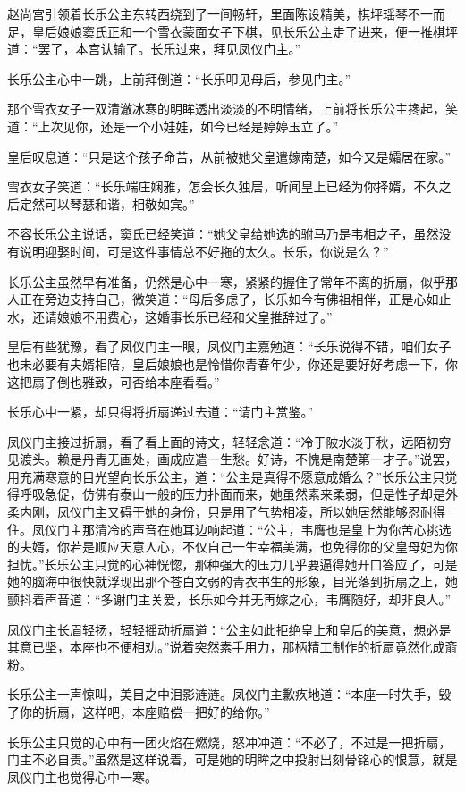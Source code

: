 赵尚宫引领着长乐公主东转西绕到了一间畅轩，里面陈设精美，棋坪瑶琴不一而足，皇后娘娘窦氏正和一个雪衣蒙面女子下棋，见长乐公主走了进来，便一推棋坪道：“罢了，本宫认输了。长乐过来，拜见凤仪门主。”

长乐公主心中一跳，上前拜倒道：“长乐叩见母后，参见门主。”

那个雪衣女子一双清澈冰寒的明眸透出淡淡的不明情绪，上前将长乐公主搀起，笑道：“上次见你，还是一个小娃娃，如今已经是婷婷玉立了。”

皇后叹息道：“只是这个孩子命苦，从前被她父皇遣嫁南楚，如今又是孀居在家。”

雪衣女子笑道：“长乐端庄娴雅，怎会长久独居，听闻皇上已经为你择婿，不久之后定然可以琴瑟和谐，相敬如宾。”

不容长乐公主说话，窦氏已经笑道：“她父皇给她选的驸马乃是韦相之子，虽然没有说明迎娶时间，可是这件事情总不好拖的太久。长乐，你说是么？”

长乐公主虽然早有准备，仍然是心中一寒，紧紧的握住了常年不离的折扇，似乎那人正在旁边支持自己，微笑道：“母后多虑了，长乐如今有佛祖相伴，正是心如止水，还请娘娘不用费心，这婚事长乐已经和父皇推辞过了。”

皇后有些犹豫，看了凤仪门主一眼，凤仪门主嘉勉道：“长乐说得不错，咱们女子也未必要有夫婿相陪，皇后娘娘也是怜惜你青春年少，你还是要好好考虑一下，你这把扇子倒也雅致，可否给本座看看。”

长乐心中一紧，却只得将折扇递过去道：“请门主赏鉴。”

凤仪门主接过折扇，看了看上面的诗文，轻轻念道：“冷于陂水淡于秋，远陌初穷见渡头。赖是丹青无画处，画成应遣一生愁。好诗，不愧是南楚第一才子。”说罢，用充满寒意的目光望向长乐公主，道：“公主是真得不愿意成婚么？”长乐公主只觉得呼吸急促，仿佛有泰山一般的压力扑面而来，她虽然素来柔弱，但是性子却是外柔内刚，凤仪门主又碍于她的身份，只是用了气势相凌，所以她居然能够忍耐得住。凤仪门主那清冷的声音在她耳边响起道：“公主，韦膺也是皇上为你苦心挑选的夫婿，你若是顺应天意人心，不仅自己一生幸福美满，也免得你的父皇母妃为你担忧。”长乐公主只觉的心神恍惚，那种强大的压力几乎要逼得她开口答应了，可是她的脑海中很快就浮现出那个苍白文弱的青衣书生的形象，目光落到折扇之上，她颤抖着声音道：“多谢门主关爱，长乐如今并无再嫁之心，韦膺随好，却非良人。”

凤仪门主长眉轻扬，轻轻摇动折扇道：“公主如此拒绝皇上和皇后的美意，想必是其意已坚，本座也不便相劝。”说着突然素手用力，那柄精工制作的折扇竟然化成齑粉。

长乐公主一声惊叫，美目之中泪影涟涟。凤仪门主歉疚地道：“本座一时失手，毁了你的折扇，这样吧，本座赔偿一把好的给你。”

长乐公主只觉的心中有一团火焰在燃烧，怒冲冲道：“不必了，不过是一把折扇，门主不必自责。”虽然是这样说着，可是她的明眸之中投射出刻骨铭心的恨意，就是凤仪门主也觉得心中一寒。

